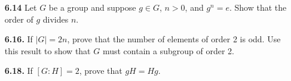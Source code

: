 \documentclass[12pt,reqno]{amsart}
\newcommand{\probskip}{\vskip1cm}
\begin{document}
\begin{enumerate}[{\bf 1.}]
\probskip

\item[{\bf 6.14}] Let $G$ be a group and suppose $g\in G$, $n> 0$, and $g^n = e$. 
Show that the order of $g$ divides $n$.

\probskip


\item[{\bf 6.16.}] 
If $|G| = 2n$, prove that the number of elements of order 2 is odd.  Use this
result to show that $G$ must contain a subgroup of order 2. 

\probskip

\item[{\bf 6.18.}] 
If $[G : H] = 2$, prove that $gH = Hg$.

\end{enumerate}
\end{document}
